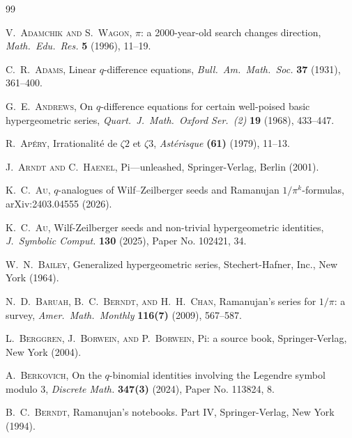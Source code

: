 \documentclass[12pt]{article}
\begin{document}
\begin{thebibliography}{99}

 \textsc{V.\ Adamchik and S.\ Wagon}, 
 $\pi$: a 2000-year-old search changes direction, 
 \emph{Math.\ Edu.\ Res.} {\bf 5} (1996), 11--19. 

 \textsc{C.\ R.\ Adams}, 
 Linear {{\(q\)}}-difference equations, 
 \emph{Bull.\ Am.\ Math.\ Soc.} {\bf 37} (1931), 361--400. 

 \textsc{G.\ E.\ Andrews}, 
 On {$q$}-difference equations for certain well-poised basic hypergeometric series, 
 \emph{Quart.\ J.\ Math.\ Oxford Ser.\ (2)} {\bf 19} (1968), 433--447. 

 \textsc{R.\ Ap\'ery}, 
 Irrationalit\'e{} de {$\zeta 2$} et {$\zeta 3$}, 
 \emph{Ast\'erisque} {\bf (61)} (1979), 11--13. 

 \textsc{J.\ Arndt and C.\ Haenel}, 
 Pi---unleashed, 
 Springer-Verlag, Berlin (2001). 

 \textsc{K.\ C.\ Au}, 
 $q$-analogues of Wilf--Zeilberger seeds and Ramanujan $1/\pi^k$-formulas, 
 arXiv:2403.04555 (2026). 

 \textsc{K.\ C.\ Au}, 
 Wilf-{Z}eilberger seeds and non-trivial hypergeometric identities, 
 \emph{J.\ Symbolic Comput.} {\bf 130} (2025), Paper No. 102421, 34. 

 \textsc{W.\ N.\ Bailey}, 
 Generalized hypergeometric series, 
 Stechert-Hafner, Inc., New York (1964). 

 \textsc{N.\ D.\ Baruah, B.\ C.\ Berndt, and H.\ H.\ Chan}, 
 Ramanujan's series for {$1/\pi$}: a survey, 
 \emph{Amer.\ Math.\ Monthly} {\bf 116(7)} (2009), 567--587. 

 \textsc{L.\ Berggren, J.\ Borwein, and P.\ Borwein}, 
 Pi: a source book, 
 Springer-Verlag, New York (2004). 

 \textsc{A.\ Berkovich}, 
 On the {$q$}-binomial identities involving the {L}egendre symbol modulo 3, 
 \emph{Discrete Math.} {\bf 347(3)} (2024), Paper No. 113824, 8. 

 \textsc{B.\ C.\ Berndt}, 
 Ramanujan's notebooks. {P}art {IV}, 
 Springer-Verlag, New York (1994). 


\end{thebibliography}
\end{document}
